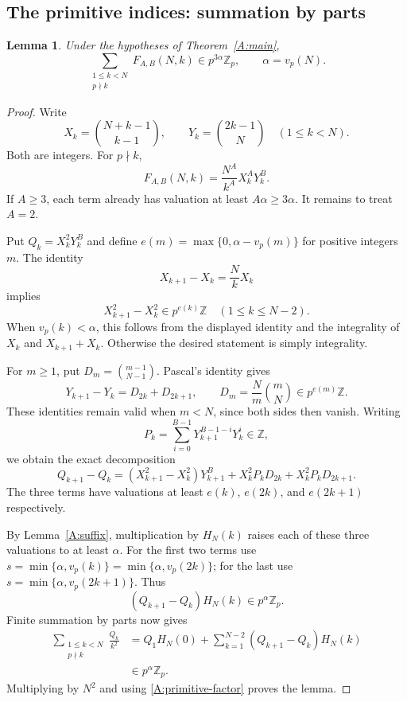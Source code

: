 \documentclass[11pt,a4paper]{article}
\newtheorem{lemma}[theorem]{Lemma}
\theoremstyle{remark}\newtheorem{remark}[theorem]{Remark}
\newcommand{\vp}{v_p}\newcommand{\Zp}{\mathbb Z_p}
\numberwithin{equation}{section}
\begin{document}
\subsection{The primitive indices: summation by parts}
\begin{lemma}\label{A:primitive}
Under the hypotheses of Theorem~\ref{A:main},
\[
\sum_{\substack{1\le k<N\\p\nmid k}}F_{A,B}(N,k)
\in p^{3\alpha}\Zp,\qquad \alpha=\vp(N).
\]
\end{lemma}
\begin{proof}
Write
\[
X_k=\binom{N+k-1}{k-1},\qquad Y_k=\binom{2k-1}{N}
\quad(1\le k<N).
\]
Both are integers. For $p\nmid k$,
\begin{equation}\label{A:primitive-factor}
F_{A,B}(N,k)=\frac{N^A}{k^A}X_k^A Y_k^B.
\end{equation}
If $A\ge3$, each term already has valuation at least $A\alpha\ge3\alpha$.
It remains to treat $A=2$.

Put $Q_k=X_k^2Y_k^B$ and define
$e(m)=\max\{0,\alpha-\vp(m)\}$ for positive integers $m$.
The identity
\[
X_{k+1}-X_k=\frac Nk X_k
\]
implies
\begin{equation}\label{A:Xincrement}
X_{k+1}^2-X_k^2\in p^{e(k)}\mathbb Z
\quad(1\le k\le N-2).
\end{equation}
When $\vp(k)<\alpha$, this follows from the displayed identity
and the integrality of $X_k$ and $X_{k+1}+X_k$. Otherwise the desired
statement is simply integrality.

For $m\ge1$, put $D_m=\binom{m-1}{N-1}$. Pascal's identity gives
\[
Y_{k+1}-Y_k=D_{2k}+D_{2k+1},\qquad
D_m=\frac Nm\binom mN\in p^{e(m)}\mathbb Z.
\]
These identities remain valid when $m<N$, since both sides then vanish.
Writing
\[
P_k=\sum_{i=0}^{B-1}Y_{k+1}^{B-1-i}Y_k^i\in\mathbb Z,
\]
we obtain the exact decomposition
\begin{equation}\label{A:Qincrement}
Q_{k+1}-Q_k=
 (X_{k+1}^2-X_k^2)Y_{k+1}^B
 +X_k^2P_kD_{2k}+X_k^2P_kD_{2k+1}.
\end{equation}
The three terms have valuations at least $e(k)$, $e(2k)$, and
$e(2k+1)$ respectively.

By Lemma~\ref{A:suffix}, multiplication by $H_N(k)$ raises each of
these three valuations to at least $\alpha$. For the first two terms
use $s=\min\{\alpha,\vp(k)\}=\min\{\alpha,\vp(2k)\}$;
for the last use $s=\min\{\alpha,\vp(2k+1)\}$.
Thus
\[
(Q_{k+1}-Q_k)H_N(k)\in p^\alpha\Zp.
\]
Finite summation by parts now gives
\begin{align*}
\sum_{\substack{1\le k<N\\p\nmid k}}\frac{Q_k}{k^2}
&=Q_1H_N(0)+\sum_{k=1}^{N-2}(Q_{k+1}-Q_k)H_N(k)\\
&\in p^\alpha\Zp.
\end{align*}
Multiplying by $N^2$ and using \eqref{A:primitive-factor} proves the lemma.
\end{proof}
\end{document}
